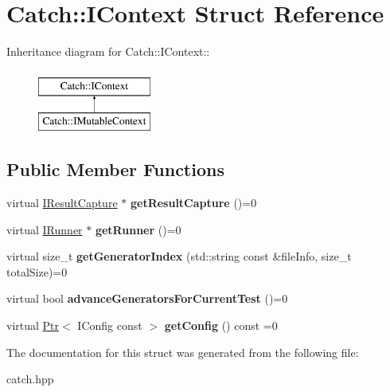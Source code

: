 \hypertarget{structCatch_1_1IContext}{
\section{Catch::IContext Struct Reference}
\label{structCatch_1_1IContext}
}
Inheritance diagram for Catch::IContext::\begin{figure}[H]
\begin{center}
\leavevmode
\includegraphics[height=2cm]{structCatch_1_1IContext}
\end{center}
\end{figure}
\subsection*{Public Member Functions}
\begin{DoxyCompactItemize}
\item 
\hypertarget{structCatch_1_1IContext_a684e4ae71d1fdf3060c352ecde1d122f}{
virtual \hyperlink{structCatch_1_1IResultCapture}{IResultCapture} $\ast$ {\bfseries getResultCapture} ()=0}
\label{structCatch_1_1IContext_a684e4ae71d1fdf3060c352ecde1d122f}

\item 
\hypertarget{structCatch_1_1IContext_af088415dde18d039ed5a2f95b02767c6}{
virtual \hyperlink{structCatch_1_1IRunner}{IRunner} $\ast$ {\bfseries getRunner} ()=0}
\label{structCatch_1_1IContext_af088415dde18d039ed5a2f95b02767c6}

\item 
\hypertarget{structCatch_1_1IContext_a43e07088db43299ba129fbe6d3106e95}{
virtual size\_\-t {\bfseries getGeneratorIndex} (std::string const \&fileInfo, size\_\-t totalSize)=0}
\label{structCatch_1_1IContext_a43e07088db43299ba129fbe6d3106e95}

\item 
\hypertarget{structCatch_1_1IContext_a806f7c4ed24d51adae90418e661b24b7}{
virtual bool {\bfseries advanceGeneratorsForCurrentTest} ()=0}
\label{structCatch_1_1IContext_a806f7c4ed24d51adae90418e661b24b7}

\item 
\hypertarget{structCatch_1_1IContext_aee81c415899262e096ad8d6f686fa365}{
virtual \hyperlink{classCatch_1_1Ptr}{Ptr}$<$ IConfig const  $>$ {\bfseries getConfig} () const =0}
\label{structCatch_1_1IContext_aee81c415899262e096ad8d6f686fa365}

\end{DoxyCompactItemize}


The documentation for this struct was generated from the following file:\begin{DoxyCompactItemize}
\item 
catch.hpp\end{DoxyCompactItemize}
